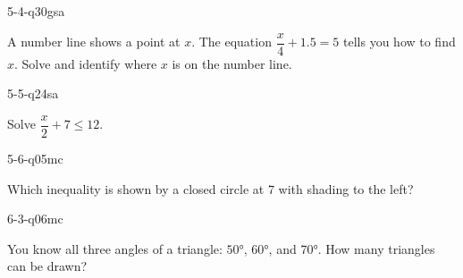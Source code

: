 \begin{practiceQuestion}{5-4-q30}{gsa}
\begin{questionText}
A number line shows a point at $x$. The equation $\dfrac{x}{4} + 1.5 = 5$ tells you how to find $x$. Solve and identify where $x$ is on the number line.

\begin{center}
\end{center}
\end{questionText}
\end{practiceQuestion}

\begin{practiceQuestion}{5-5-q24}{sa}
\begin{questionText}
Solve $\dfrac{x}{2} + 7 \leq 12$.
\end{questionText}
\end{practiceQuestion}

\begin{practiceQuestion}{5-6-q05}{mc}
\begin{questionText}
Which inequality is shown by a closed circle at $7$ with shading to the left?
\end{questionText}
\end{practiceQuestion}

\begin{practiceQuestion}{6-3-q06}{mc}
\begin{questionText}
You know all three angles of a triangle: $50°$, $60°$, and $70°$. How many triangles can be drawn?
\end{questionText}
\end{practiceQuestion}

